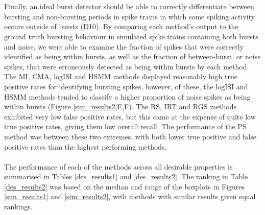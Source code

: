 \documentclass[12pt, titlepage]{article}
\begin{document}
	\\ \\ Finally, an ideal burst detector should be able to correctly differentiate between bursting and non-bursting periods in spike trains in which some spiking activity occurs outside of bursts (D10). By comparing each method's output to the ground truth bursting behaviour in simulated spike trains containing both bursts and noise, we were able to examine the fraction of spikes that were correctly identified as being within bursts, as well as the fraction of between-burst, or noise spikes, that were erroneously detected as being within bursts by each method.
	The MI, CMA, logISI and HSMM methods displayed reasonably high true positive rates for identifying bursting spikes, however, of these, the logISI and HSMM methods tended to classify a higher proportion of noise spikes as being within bursts (Figure \ref{sim_results2}E,F). The RS, IRT and RGS methods exhibited very low false positive rates, but this came at the expense of quite low true positive rates, giving them low overall recall. The performance of the PS method was between these two extremes, with both lower true positive and false positive rates than the highest performing methods.
	\\ \\ The performance of each of the methods across all desirable properties is summarised in Tables \ref{des_results1} and \ref{des_results2}. The ranking in Table \ref{des_results2} was based on the median and range of the boxplots in Figures \ref{sim_results1} and \ref{sim_results2}, with methods with similar results given equal rankings.
\end{document}
